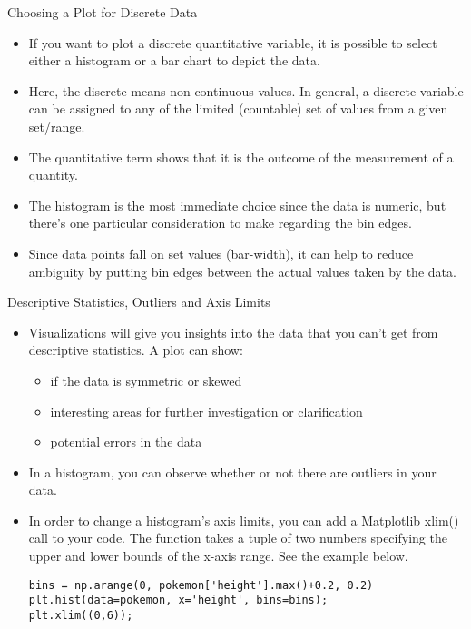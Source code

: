 \documentclass[12pt]{beamer}
\begin{document}
    \begin{frame}{Choosing a Plot for Discrete Data}
    	\begin{itemize}
    		\item If you want to plot a discrete quantitative variable, it is possible to select either a histogram or a bar chart to depict the data.
    		\item Here, the discrete means non-continuous values. In general, a discrete variable can be assigned to any of the limited (countable) set of values from a given set/range.
    		\item The quantitative term shows that it is the outcome of the measurement of a quantity.
    		\item The histogram is the most immediate choice since the data is numeric, but there's one particular consideration to make regarding the bin edges.
    		\item Since data points fall on set values (bar-width), it can help to reduce ambiguity by putting bin edges between the actual values taken by the data.
    	\end{itemize}
    \end{frame}
    \begin{frame}[fragile]{Descriptive Statistics, Outliers and Axis Limits}
    	\begin{itemize}
    		\item Visualizations will give you insights into the data that you can't get from descriptive statistics. A plot can show:
    		\begin{itemize}
    			\item if the data is symmetric or skewed
    			\item interesting areas for further investigation or clarification
    			\item potential errors in the data
    		\end{itemize}
    	\item In a histogram, you can observe whether or not there are outliers in your data.
    	\item  In order to change a histogram's axis limits, you can add a Matplotlib xlim() call to your code. The function takes a tuple of two numbers specifying the upper and lower bounds of the x-axis range. See the example below.
    	\begin{verbatim}
bins = np.arange(0, pokemon['height'].max()+0.2, 0.2)
plt.hist(data=pokemon, x='height', bins=bins);
plt.xlim((0,6));
    	\end{verbatim}
    	\end{itemize}
    \end{frame}
\end{document}
